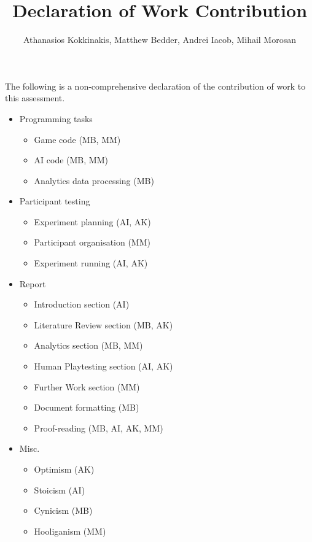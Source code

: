 \documentclass[9pt]{IEEEtran}
\title{Declaration of Work Contribution}
\author{Athanasios Kokkinakis, Matthew Bedder, Andrei Iacob, Mihail Morosan}
\begin{document}
\onecolumn

\maketitle

The following is a non-comprehensive declaration of the contribution of work to this assessment.

\vspace{2em}

\begin{itemize}
	\item Programming tasks
	\begin{itemize}
		\item Game code (MB, MM)
		\item AI code (MB, MM)
		\item Analytics data processing (MB)
	\end{itemize}
	\item Participant testing
	\begin{itemize}
		\item Experiment planning (AI, AK)
		\item Participant organisation (MM)
		\item Experiment running (AI, AK)
	\end{itemize}
	\item Report
	\begin{itemize}
		\item Introduction section (AI)
		\item Literature Review section (MB, AK)
		\item Analytics section (MB, MM)
		\item Human Playtesting section (AI, AK)
		\item Further Work section (MM)
		\item Document formatting (MB)
		\item Proof-reading (MB, AI, AK, MM)
	\end{itemize}
	\item Misc.
	\begin{itemize}
		\item Optimism (AK)
		\item Stoicism (AI)
		\item Cynicism (MB)
		\item Hooliganism (MM)
	\end{itemize}
\end{itemize}
\end{document}
